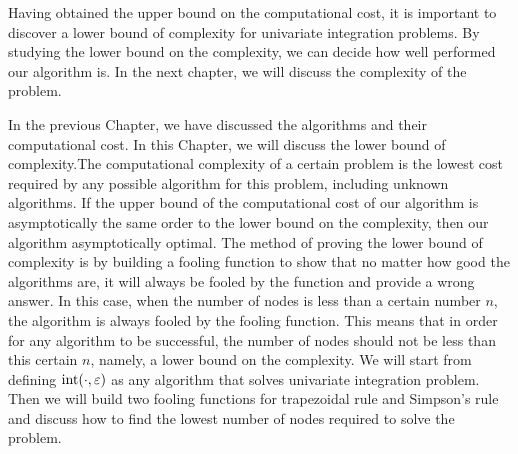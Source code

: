 \documentclass[draft]{iitthesis}
\theoremstyle{definition}
\theoremstyle{remark}
\begin{document}
Having obtained the upper bound on the computational cost, it is important to discover a lower bound of complexity for univariate integration problems. By studying the lower bound on the complexity, we can decide how well performed our algorithm is. In the next chapter, we will discuss the complexity of the problem.


In the previous Chapter, we have discussed the algorithms and their computational cost. In this Chapter, we will discuss the lower bound of complexity.The computational complexity of a certain problem is the lowest cost required by any possible algorithm for this problem, including unknown algorithms. If the upper bound of the computational cost of our algorithm is asymptotically the same order to the lower bound on the complexity, then our algorithm asymptotically optimal. The method of proving the lower bound of complexity is by building a fooling function to show that no matter how good the algorithms are, it will always be fooled by the function and provide a wrong answer. In this case, when the number of nodes is less than a certain number $n$, the algorithm is always fooled by the fooling function. This means that in order for any algorithm to be successful, the number of nodes should not be less than this certain $n$, namely, a lower bound on the complexity. We will start from defining $\textup{int}(\cdot,\varepsilon)$ as any algorithm that solves univariate integration problem. Then we will build two fooling functions for trapezoidal rule and Simpson's rule and discuss how to find the lowest number of nodes required to solve the problem.

\end{document}
